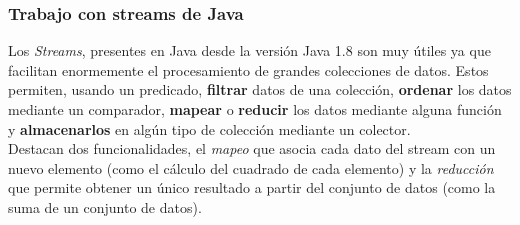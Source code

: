
%

\subsubsection{Trabajo con streams de Java}

Los \textit{Streams}, presentes en Java desde la versión Java 1.8 son muy útiles ya que facilitan enormemente el procesamiento de grandes colecciones de datos. Estos permiten, usando un predicado, \textbf{filtrar} datos de una colección, \textbf{ordenar} los datos mediante un comparador, \textbf{mapear} o \textbf{reducir} los datos mediante alguna función y \textbf{almacenarlos} en algún tipo de colección mediante un colector. \\ 
Destacan dos funcionalidades, el \textit{mapeo} que asocia cada dato del stream con un nuevo elemento (como el cálculo del cuadrado de cada elemento) y la \textit{reducción} que permite obtener un único resultado a partir del conjunto de datos (como la suma de un conjunto de datos).

